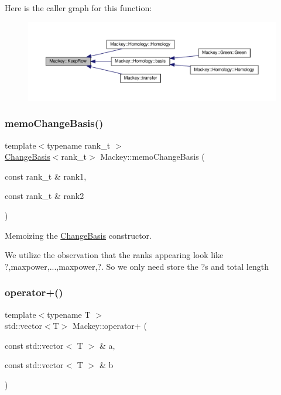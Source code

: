 Here is the caller graph for this function\+:\nopagebreak
\begin{figure}[H]
\begin{center}
\leavevmode
\includegraphics[width=350pt]{namespaceMackey_ae44b27dcf905a7ff976ebc79f197c579_icgraph}
\end{center}
\end{figure}
\mbox{\label{namespaceMackey_a70952d513d08b47bc282441a3e9d732c}} 
\subsubsection{\texorpdfstring{memo\+Change\+Basis()}{memoChangeBasis()}}
{\footnotesize\ttfamily template$<$typename rank\+\_\+t $>$ \\
\hyperlink{classMackey_1_1ChangeBasis}{Change\+Basis}$<$rank\+\_\+t$>$ Mackey\+::memo\+Change\+Basis (\begin{DoxyParamCaption}\item[{const rank\+\_\+t \&}]{rank1,  }\item[{const rank\+\_\+t \&}]{rank2 }\end{DoxyParamCaption})}



Memoizing the \hyperlink{classMackey_1_1ChangeBasis}{Change\+Basis} constructor. 

We utilize the observation that the ranks appearing look like ?,maxpower,...,maxpower,?. So we only need store the ?\textquotesingle{}s and total length \mbox{\label{namespaceMackey_adb4974b5ffe533abb955ccb6b9096155}} 
\subsubsection{\texorpdfstring{operator+()}{operator+()}}
{\footnotesize\ttfamily template$<$typename T $>$ \\
std\+::vector$<$T$>$ Mackey\+::operator+ (\begin{DoxyParamCaption}\item[{const std\+::vector$<$ T $>$ \&}]{a,  }\item[{const std\+::vector$<$ T $>$ \&}]{b }\end{DoxyParamCaption})}



